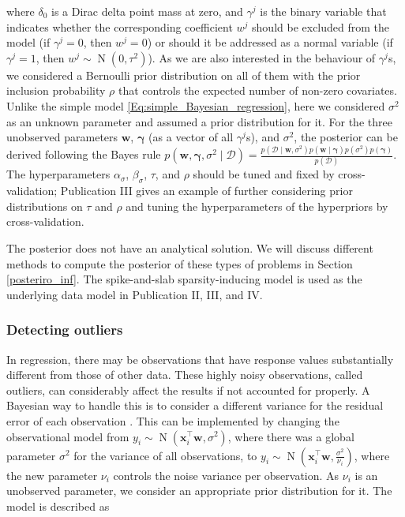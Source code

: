 \documentclass[dissertation,math,vertlayout,pdfa,colorlinks]{aaltoseries}
\newcommand{\bw}{\bm{w}}
\newcommand{\bD}{\mathcal{D}}
\DeclareMathOperator{\normalpdf}{N}
\newcommand{\tp}{^{\top}}
\begin{document}
\noindent where $\delta_0$ is a Dirac delta point mass at zero, and $\gamma^j$ is the binary variable that indicates whether the corresponding coefficient $w^j$ should be excluded from the model (if $\gamma^j=0$, then $w^j=0$) or should it be addressed as a normal variable (if $\gamma^j=1$, then $w^j \sim \normalpdf(0, \tau^2)$). As we are also interested in the behaviour of $\gamma^j$s, we considered a Bernoulli prior distribution on all of them with the prior inclusion probability $\rho$ that controls the expected number of non-zero covariates. Unlike the simple model \ref{Eq:simple_Bayesian_regression}, here we considered $\sigma^{2}$ as an unknown parameter and assumed a prior distribution for it. For the three unobserved parameters $\bw$, $\bm{\gamma}$ (as a vector of all $\gamma^j$s), and $\sigma^2$, the posterior can be derived following the Bayes rule $p(\bw, \bm{\gamma}, \sigma^2 \mid \bD) = \frac{p(\bD \mid \bw, \sigma^2)p(\bw \mid \bm{\gamma})p(\sigma^2)p(\bm{\gamma})}{p(\bD)}$. The hyperparameters $\alpha_{\sigma}$, $\beta_{\sigma}$, $\tau$, and $\rho$ should be tuned and fixed by cross-validation; Publication III gives an example of further considering prior distributions on $\tau$ and $\rho$ and tuning the hyperparameters of the hyperpriors by cross-validation.%

The posterior does not have an analytical solution. We will discuss different methods to compute the posterior of these types of problems in Section \ref{posteriro_inf}. The spike-and-slab sparsity-inducing model \cite{spike_slab1993} is used as the underlying data model in Publication II, III, and IV. 


\subsubsection{Detecting outliers}

In regression, there may be observations that have response values substantially different from those of other data. These highly noisy observations, called outliers, can considerably affect the results if not accounted for properly. A Bayesian way to handle this is to consider a different variance for the residual error of each observation \cite{Bayesian_ARD2007,Kangasraasio_2016_interactive}. This can be implemented by changing the observational model from $y_i\sim \normalpdf(\bm{x}_i\tp\bw,\sigma^2)$, where there was a global parameter $\sigma^2$ for the variance of all observations, to $y_i \sim \normalpdf(\bm{x}_i\tp\bw,\frac{\sigma^2}{\nu_i})$, where the new parameter $\nu_i$ controls the noise variance per observation. As $\nu_i$ is an unobserved parameter, we consider an appropriate prior distribution for it. The model is described as 
\end{document}
